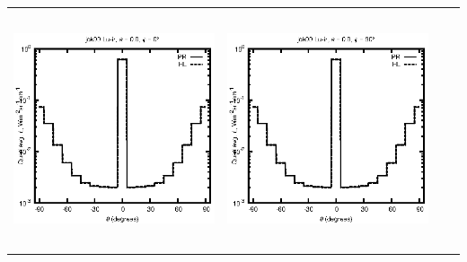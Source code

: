\documentclass[10pt,a4paper]{article}
\begin{document}
\begin{adjustwidth}{-1.2in}{-1.2in}
\begin{tabular}{c c c c}
\includegraphics[height=7cm]{../eps/jok00_Lu_ir_fwd.eps} &
\includegraphics[height=7cm]{../eps/jok00_Lu_ir_cross.eps} \\
\end{tabular}

\pagebreak


\end{adjustwidth}
\end{document}
